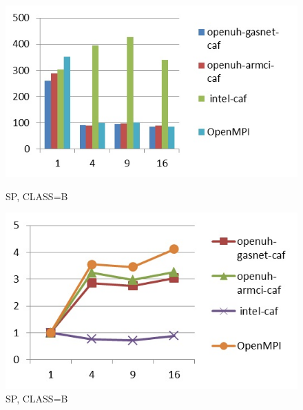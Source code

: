 \begin{figure}[ht]
\begin{minipage}[b]{0.45\linewidth}
\centering
\includegraphics[width=\textwidth]{./figures/sp_B_time.jpg}
\caption{SP, CLASS=B}
\label{fig:figure1}
\end{minipage}
\hspace{0.5cm}
\begin{minipage}[b]{0.45\linewidth}
\centering
\includegraphics[width=\textwidth]{./figures/sp_B_scalability.jpg}
\caption{SP, CLASS=B}
\label{fig:figure2}
\end{minipage}
\end{figure}


